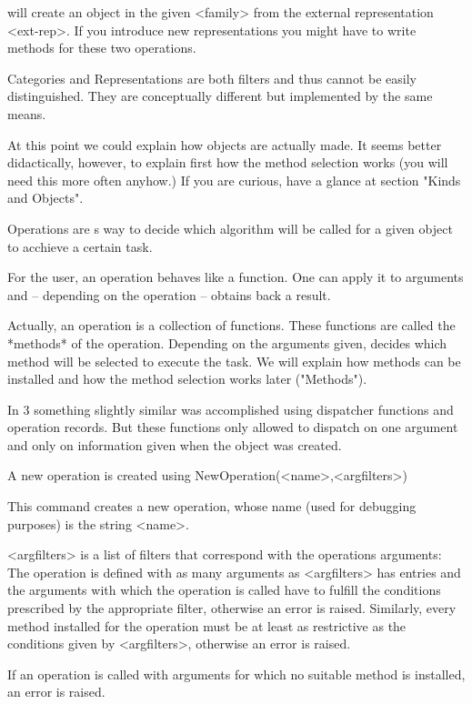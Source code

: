 will create an object in the given <family> from the external representation
<ext-rep>. If you introduce new representations you might have to write
methods for these two operations.

\danger
Categories and Representations are both filters and thus cannot be easily
distinguished. They are conceptually different but implemented by the same
means.

At this point we could explain how objects are actually made. It seems
better didactically, however, to explain first how the method selection
works (you will need this more often anyhow.) If you are curious, have a
glance at section "Kinds and Objects".


Operations are {\GAP}s way to decide which algorithm will be called for a
given object to acchieve a certain task. 

For the user, an operation behaves like a function. One can apply it to
arguments and -- depending on the operation -- obtains back a result.

Actually, an operation is a collection of functions. These functions are
called the *methods* of the operation. Depending on the arguments given,
{\GAP} decides which method will be selected to execute the task.
We will explain how methods can be installed and how the method selection
works later ("Methods").

\danger
In {\GAP} 3 something slightly similar was accomplished using dispatcher
functions and operation records. But these functions only allowed to
dispatch on one argument and only on information given when the object was
created.

A new operation is created using
\>NewOperation(<name>,<argfilters>)

This command creates a new operation, whose name (used for debugging
purposes) is the string <name>.

<argfilters> is a list of filters that correspond with the operations
arguments: The operation is defined with as many arguments as <argfilters> has
entries and the arguments with which the operation is called have to fulfill
the conditions prescribed by the appropriate filter, otherwise an error is
raised. Similarly, every method installed for the operation must be at least
as restrictive as the conditions given by <argfilters>, otherwise an error
is raised.

If an operation is called with arguments for which no suitable method
is installed, an error is raised.


